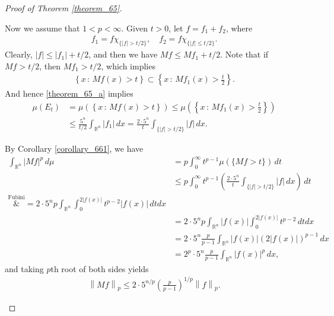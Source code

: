 \documentclass[11pt]{book}
\theoremstyle{definition}
\numberwithin{equation}{chapter}
\begin{document}
\begin{proof}[Proof of Theorem \ref{theorem_65}]
\begin{enumerate}[label=(\alph*)]
    Now we assume that $1 < p < \infty$. Given $t > 0$, let $f = f_1 + f_2$, where 
    \begin{align*}
        f_1 = f\chi_{\{\left|f\right| > t/2\}}, \quad f_2 = f\chi_{\{\left|f\right| \leq t/2\}}.
    \end{align*}
    Clearly, $\left|f\right| \leq \left|f_1\right| + t/2$, and then we have $Mf \leq Mf_1 + t/2$. Note that if $Mf > t/2$, then $Mf_1 > t/2$, which implies
    \begin{align*}
        \left\{x \,:\, Mf(x) > t\right\} 
        \subset \left\{x \,:\, Mf_1(x) > \frac{t}{2}\right\}.
    \end{align*}
    And hence \ref{theorem_65_a} implies 
    \begin{align*}
        \mu(E_t) & = \mu(\left\{x \,:\, Mf(x) > t\right\}) \leq \mu \left(\left\{x \,:\, Mf_1(x) > \frac{t}{2}\right\}\right) \\
        & \leq \frac{5^n}{t/2} \int_{\mathbb{R}^n} \left|f_1\right| \,dx = \frac{2 \cdot 5^n}{t} \int_{\{\left|f\right| > t/2\}} \left|f\right| \,dx. 
    \end{align*}
    
    By Corollary \ref{corollary_661}, we have
    \begin{align*}
        \int_{\mathbb{R}^n} \left|Mf\right|^p \,d\mu & = p \int^\infty_0 t^{p-1} \mu(\{Mf > t\}) \,dt \\ 
        & \leq p \int^\infty_0 t^{p-1} \left(\frac{2 \cdot 5^n}{t} \int_{\{\left|f\right| > t/2\}} \left|f\right| \,dx\right) \,dt \\
        \overset{\text{Fubini}}&{=} 2 \cdot 5^n p \int_{\mathbb{R}^n} \int^{2\left|f(x)\right|}_0 t^{p-2} \left|f(x)\right| \,dtdx \\
        & = 2 \cdot 5^n p \int_{\mathbb{R}^n} \left|f(x)\right| \int^{2\left|f(x)\right|}_0 t^{p-2} \, dtdx \\
        & = 2 \cdot 5^n \frac{p}{p-1}  \int_{\mathbb{R}^n} \left|f(x)\right| \left(2\left|f(x)\right|\right)^{p-1} \,dx \\
        & = 2^p \cdot 5^n \frac{p}{p-1} \int_{\mathbb{R}^n} \left|f(x)\right|^p \,dx,
    \end{align*}
    and taking $p$th root of both sides yields
    \begin{align*}
        \left\|Mf\right\|_p \leq 2 \cdot 5^{n/p} \left(\frac{p}{p-1}\right)^{1/p} \left\|f\right\|_p.
    \end{align*}
\end{enumerate}
\end{proof}
\end{document}
